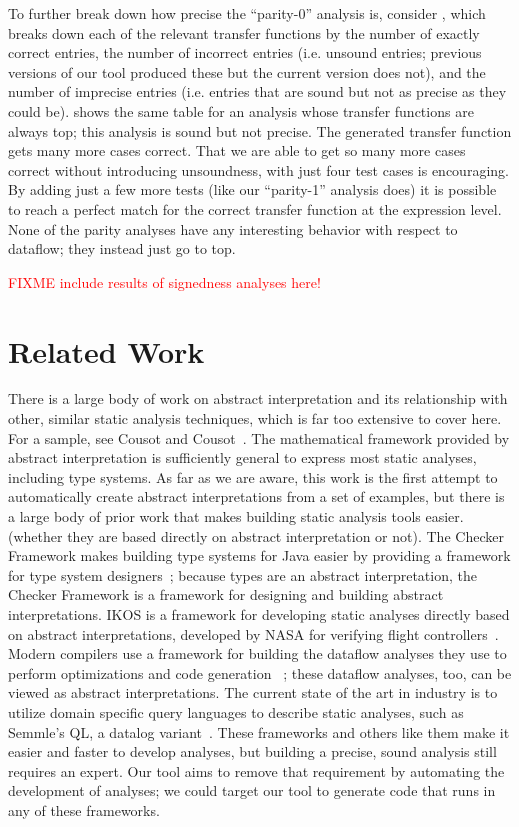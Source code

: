 \documentclass[10pt,conference]{IEEEtran}
\begin{document}
To further break
down how precise the ``parity-0'' analysis is, consider , which breaks
down each of the relevant transfer functions by the number of exactly correct
entries, the number of incorrect entries (i.e. unsound entries; previous
versions of our tool produced these but the current version does not), and the
number of imprecise entries (i.e. entries that are sound but not as precise
as they could be).  shows the same table for an analysis whose
transfer functions are always top; this analysis is sound but not precise.
The generated transfer function gets many more cases correct.
That we are able to get so many more cases correct
without introducing unsoundness, with just four test cases
is encouraging. By adding just a few more tests (like our ``parity-1''
analysis does) it is possible to reach a perfect match for the correct
transfer function at the expression level. None of the parity analyses
have any interesting behavior with respect to dataflow; they instead
just go to top.

\textcolor{red}{FIXME include results of signedness analyses here!}

\section{Related Work}

There is a large body of work on abstract interpretation and its relationship
with other, similar static analysis techniques, which is far
too extensive to cover here.
For a sample, see Cousot and Cousot~\cite{cousot14}.
The mathematical framework provided by abstract interpretation is sufficiently
general to express most static analyses, including type systems.
As far as we are aware, this work is the first attempt to automatically
create abstract interpretations from a set of examples, but there is a
large body of prior work that makes building static analysis tools easier.
(whether they are based directly on abstract interpretation or not).
The Checker Framework makes building type systems for Java easier
by providing a framework for type system designers~\cite{checker-framework};
because types are an abstract interpretation, the Checker Framework
is a framework for designing and building abstract interpretations.
IKOS is a framework for developing static analyses directly based on
abstract interpretations, developed by NASA for verifying flight
controllers~\cite{ikos}. Modern compilers use a framework for building
the dataflow analyses they use to perform optimizations and code generation
~\cite{lattner04:_llvm}; these dataflow analyses, too, can be viewed as
abstract interpretations. The current state of the art in industry is to
utilize domain specific query languages to describe static analyses, such as 
Semmle's QL, a datalog variant~\cite{semmle-ql-primer}.
These frameworks and others like them make it easier and faster to develop analyses, but 
building a precise, sound analysis still requires an expert.  Our tool 
aims to remove that requirement by automating the development of analyses; 
we could target our tool to generate code that runs in any of these frameworks.
\end{document}

